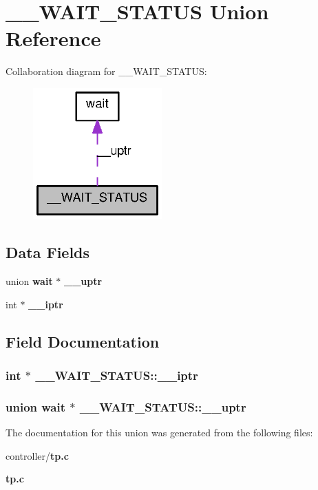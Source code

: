 \section{\_\-\_\-WAIT\_\-STATUS Union Reference}
\label{union____WAIT__STATUS}


Collaboration diagram for \_\-\_\-WAIT\_\-STATUS:
\nopagebreak
\begin{figure}[H]
\begin{center}
\leavevmode
\includegraphics[width=140pt]{union____WAIT__STATUS__coll__graph}
\end{center}
\end{figure}
\subsection*{Data Fields}
\begin{DoxyCompactItemize}
\item 
union {\bf wait} $\ast$ {\bf \_\-\_\-uptr}
\item 
int $\ast$ {\bf \_\-\_\-iptr}
\end{DoxyCompactItemize}


\subsection{Field Documentation}
\subsubsection[{\_\-\_\-iptr}]{\setlength{\rightskip}{0pt plus 5cm}int $\ast$ {\bf \_\-\_\-WAIT\_\-STATUS::\_\-\_\-iptr}}\label{union____WAIT__STATUS_ae4b081c78ad9af629d52add24cc67a30}
\subsubsection[{\_\-\_\-uptr}]{\setlength{\rightskip}{0pt plus 5cm}union {\bf wait} $\ast$ {\bf \_\-\_\-WAIT\_\-STATUS::\_\-\_\-uptr}}\label{union____WAIT__STATUS_a2e2a9345006a544cacbe3aaa9f37c320}


The documentation for this union was generated from the following files:\begin{DoxyCompactItemize}
\item 
controller/{\bf tp.c}\item 
{\bf tp.c}\end{DoxyCompactItemize}
